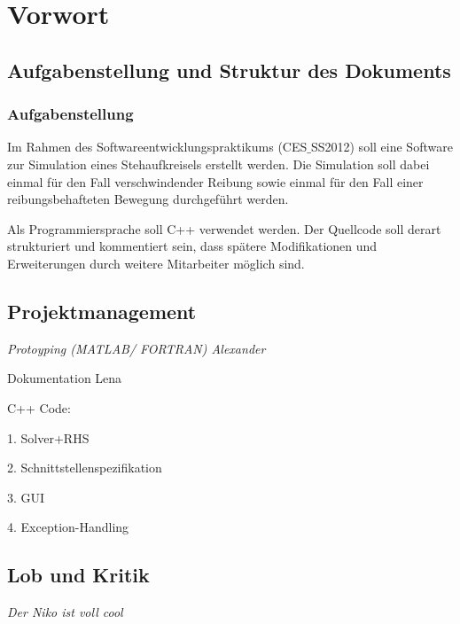 \chapter{Vorwort}
\label{ch:1}

\section{Aufgabenstellung und Struktur des Dokuments}
\label{sec:1.1}

\subsection*{Aufgabenstellung}

{Im Rahmen des Softwareentwicklungspraktikums (CES$\_$SS2012) soll eine Software zur Simulation eines Stehaufkreisels erstellt werden.
Die Simulation soll dabei einmal für den Fall verschwindender
Reibung sowie einmal für den Fall einer reibungsbehafteten Bewegung durchgeführt werden. 

Als Programmiersprache soll C++ verwendet werden. Der Quellcode soll derart strukturiert
und kommentiert sein, dass spätere Modifikationen und Erweiterungen durch weitere
Mitarbeiter möglich sind.}

\section{Projektmanagement}
\label{sec:1.2}

{\em 
Protoyping (MATLAB/ FORTRAN) Alexander

Dokumentation Lena

C++ Code:

1. Solver+RHS

2. Schnittstellenspezifikation

3. GUI

4. Exception-Handling

}

\section{Lob und Kritik}
\label{sec:1.3}

{\em Der Niko ist voll cool}

